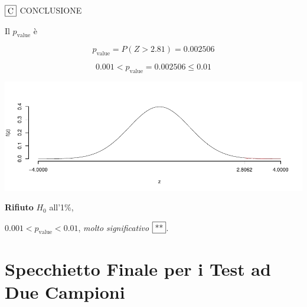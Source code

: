 \documentclass[
  11pt,
]{book}
\theoremstyle{mytheoremstyle}
\theoremstyle{mydefstyle}
\begin{document}
\(\fbox{C}\) CONCLUSIONE

Il \(p_{\text{value}}\) è

\[ p_{\text{value}} = P(Z>2.81)=0.002506 \]

\[
 0.001 < p_\text{value}= 0.002506 \leq 0.01 
\]

\begin{center}\includegraphics{Appunti_di_Statistica_2025_files/figure-latex/16-test-2C-3,-1} \end{center}

\textbf{Rifiuto} \(H_0\) all'1\%,

\(0.001<p_\text{value}<0.01\), \emph{molto significativo} \(\fbox{**}\).

\section{Specchietto Finale per i Test ad Due Campioni}\label{specchietto-finale-per-i-test-ad-due-campioni}
\end{document}

